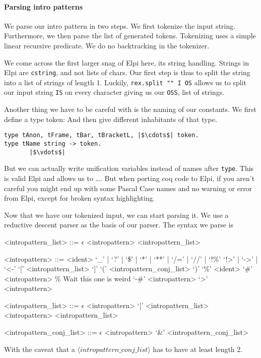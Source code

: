 \documentclass[thesis.tex]{subfiles}
\begin{document}
{{\paragraph*{Parsing intro patterns}
We parse our intro pattern in two steps. We first tokenize the input string. Furthermore, we then parse the list of generated tokens. Tokenizing uses a simple linear recursive predicate. We do no backtracking in the tokenizer.

We come across the first larger snag of Elpi here, its string handling. Strings in Elpi are \texttt{cstring}, and not lists of chars. Our first step is thus to split the string into a list of strings of length 1. Luckily, \texttt{rex.split "" I OS} allows us to split our input string \texttt{IS} on every character giving us our \texttt{OSS}, list of strings.

Another thing we have to be careful with is the naming of our constants. We first define a type token:  And then give different inhabitants of that type.
\begin{verbatim}
type tAnon, tFrame, tBar, tBracketL, |$\cdots$| token.
type tName string -> token.
       |$\vdots$|
\end{verbatim}
But we can actually write unification variables instead of names after \texttt{type}. This is valid Elpi and allows us to \dots. But when porting coq code to Elpi, if you aren't careful you might end up with some Pascal Case names and no warning or error from Elpi, except for broken syntax highlighting.

Now that we have our tokenized input, we can start parsing it. We use a reductive descent parser as the basis of our parser. The syntax we parse is
\begin{grammar}
  <intropattern\_list> ::= $\epsilon$
  \alt <intropattern> <intropattern\_list>

  <intropattern> ::= <ident>
  \alt `_' | `?' | `\$' | `*' | `**' | `/=' | `//' | `!\%'
  \alt `!>' | `->' | `<-'
  \alt `[' <intropattern\_list> `]'
  \alt `(' <intropattern\_conj\_list> `)'
  \alt `\%' <ident>
  \alt `#' <intropattern> \% Wait this one is weird
  \alt `-#' <intropattern>
  \alt `>' <intropattern>

  <intropattern\_list> ::= $\epsilon$
  \alt <intropattern> `|' <intropattern\_list>
  \alt <intropattern> <intropattern\_list>

  <intropattern\_conj\_list> ::= $\epsilon$
  \alt <intropattern> `&' <intropattern\_conj\_list>
\end{grammar}
With the caveat that a $\langle intropattern\_conj\_list\rangle$ has to have at least length 2.

}}
\end{document}
